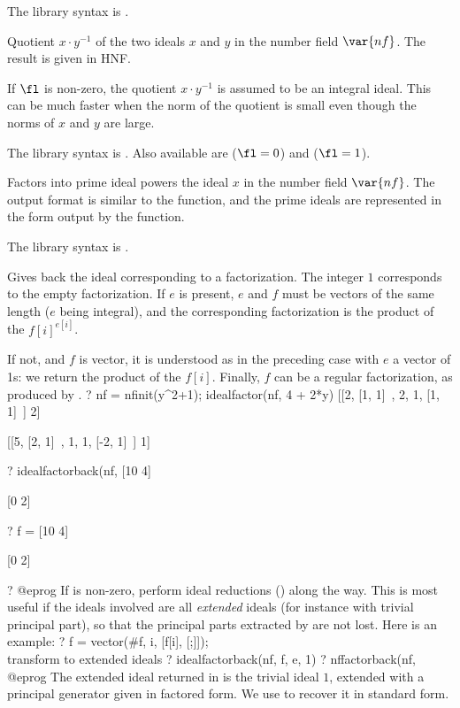 The library syntax is .

\label{se:idealdiv}
Quotient $x\cdot y^{-1}$ of the two ideals $x$ and $y$ in the number
field $\var{nf}$. The result is given in HNF.

If $\fl$ is non-zero, the quotient $x \cdot y^{-1}$ is assumed to be an
integral ideal. This can be much faster when the norm of the quotient is
small even though the norms of $x$ and $y$ are large.

The library syntax is .
Also available are 
($\fl=0$) and  ($\fl=1$).

\label{se:idealfactor}
Factors into prime ideal powers the
ideal $x$ in the number field $\var{nf}$. The output format is similar to the
 function, and the prime ideals are represented in the form
output by the  function.

The library syntax is .

\label{se:idealfactorback}
Gives back the ideal corresponding to a factorization. The integer $1$
corresponds to the empty factorization.
If $e$ is present, $e$ and $f$ must be vectors of the same length ($e$ being
integral), and the corresponding factorization is the product of the
$f[i]^{e[i]}$.

If not, and $f$ is vector, it is understood as in the preceding case with $e$
a vector of 1s: we return the product of the $f[i]$. Finally, $f$ can be a
regular factorization, as produced by .
\bprog
? nf = nfinit(y^2+1); idealfactor(nf, 4 + 2*y)
[[2, [1, 1]~, 2, 1, [1, 1]~] 2]

[[5, [2, 1]~, 1, 1, [-2, 1]~] 1]

? idealfactorback(nf, %
[10 4]

[0  2]

? f = %
[10 4]

[0  2]

? %
@eprog
If  is non-zero, perform ideal reductions () along the
way. This is most useful if the ideals involved are all \emph{extended}
ideals (for instance with trivial principal part), so that the principal parts
extracted by  are not lost. Here is an example:
\bprog
? f = vector(#f, i, [f[i], [;]]);  \\ transform to extended ideals
? idealfactorback(nf, f, e, 1)
? nffactorback(nf, %
@eprog
The extended ideal returned in  is the trivial ideal $1$, extended
with a principal generator given in factored form. We use 
to recover it in standard form.

